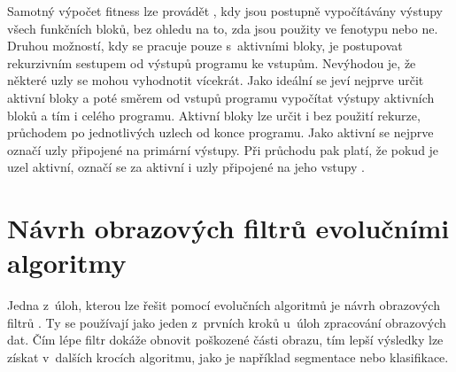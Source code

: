 




Samotný výpočet fitness lze provádět , kdy jsou postupně vypočítávány výstupy všech funkčních bloků, bez ohledu na to, zda jsou použity ve fenotypu nebo ne. Druhou možností, kdy se pracuje pouze s~aktivními bloky, je postupovat rekurzivním sestupem od výstupů programu ke vstupům. Nevýhodou je, že některé uzly se mohou vyhodnotit vícekrát. Jako ideální se jeví nejprve určit aktivní bloky a poté směrem od vstupů programu vypočítat výstupy aktivních bloků a tím i celého programu. Aktivní bloky lze určit i bez použití rekurze, průchodem po jednotlivých uzlech od konce programu. Jako aktivní se nejprve označí uzly připojené na primární výstupy. Při průchodu pak platí, že pokud je uzel aktivní, označí se za aktivní i uzly připojené na jeho vstupy \cite{Modra, HandbookGP}.

\section{Návrh obrazových filtrů evolučními algoritmy}
\label{secIF}

Jedna z~úloh, kterou lze řešit pomocí evolučních algoritmů je návrh obrazových filtrů \cite{ZelenaIF}. Ty se používají jako jeden z~prvních kroků u~úloh zpracování obrazových dat. Čím lépe filtr dokáže obnovit poškozené části obrazu, tím lepší výsledky lze získat v~dalších krocích algoritmu, jako je například segmentace nebo klasifikace.

